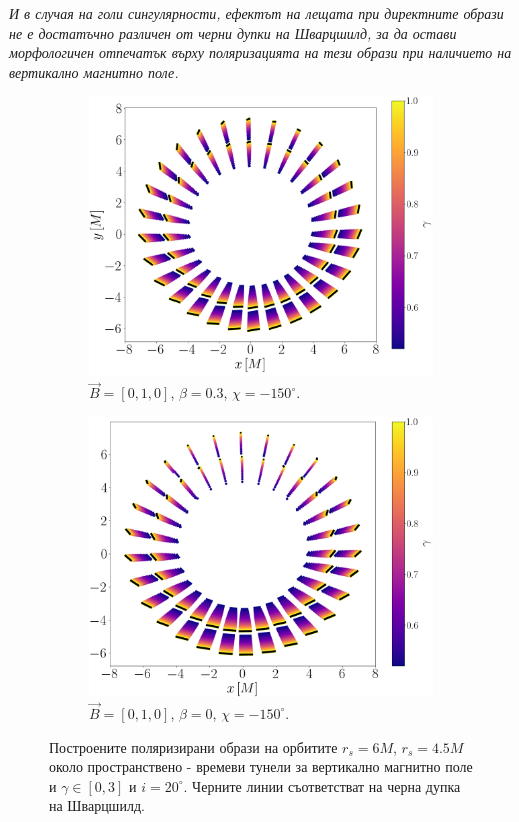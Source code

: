 \emph{И в случая на голи сингулярности, ефектът на лещата при директните образи не е достатъчно различен от черни дупки на Шварцшилд, за да остави морфологичен отпечатък върху поляризацията на тези образи при наличието на вертикално магнитно поле.}

\begin{figure}[!htb]
	\centering
	\begin{subfigure}{7cm}
		\includegraphics[scale = 0.2]{JNW_alpha_Vert_Field.png}
		\caption{$\vec{B} = [0, 1, 0]$, $\beta = 0.3$, $\chi = -150^\circ$.} 
	\end{subfigure}
	\begin{subfigure}{7cm}
		\hspace{1cm}
		\includegraphics[scale = 0.2]{JNW_alpha_Vert_Field_beta_zero.png}
		\caption{$\vec{B} = [0, 1, 0]$, $\beta = 0$, $\chi = -150^\circ$.}
	\end{subfigure}
	\caption[Поляризирани образи около пространствено - времеви тунели за вертикално магнитно поле.]{\small Построените поляризирани образи на орбитите $r_s = 6M$, $r_s = 4.5M$ около пространствено - времеви тунели за вертикално магнитно поле и $\gamma \in[0,3]$ и $i = 20^\circ$. Черните линии съответстват на черна дупка на Шварцшилд.} 
	\label{JNW_pol_vert_field}
\end{figure}

